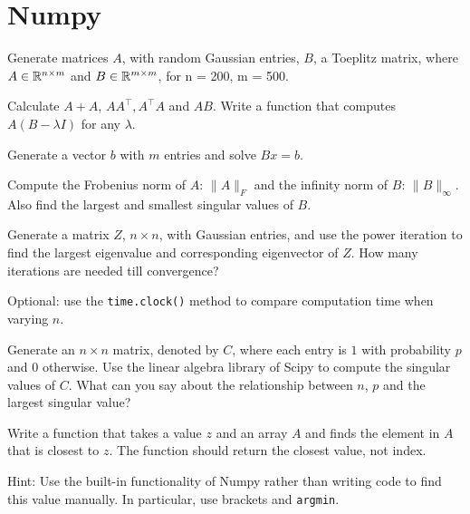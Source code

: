 \section{Numpy} %
\label{sec:numpy}
Generate matrices $A$, with random Gaussian entries, $B$, a Toeplitz matrix, where
$A \in \mathbb{R}^{n\times m}$ and $B \in \mathbb{R}^{m \times m}$, for n = 200, m = 500.

\begin{questions}

\label{sub:mat_ops}

Calculate $A + A$, $A A^\top, A^\top A$ and $AB$.
Write a function that computes $A(B - \lambda I)$ for any $\lambda$.

\label{sub:linear_system}

Generate a vector $b$ with $m$ entries and solve $Bx = b$.

\label{sub:norms}

Compute the Frobenius norm of $A$: $\|A\|_F$ and the infinity norm of $B$:
$\|B\|_{\infty}$. Also find the largest and smallest singular values of $B$.


\label{sub:power}

Generate a matrix $Z$, $n \times n$, with Gaussian entries, and use the power iteration to
find the largest eigenvalue and corresponding eigenvector of $Z$.
How many iterations are needed till convergence?

Optional: use the \texttt{time.clock()} method to compare computation time when varying $n$.

\label{sub:svd}

Generate an $n \times n$ matrix, denoted by $C$, where each entry is $1$ with probability $p$ and
$0$ otherwise.
Use the linear algebra library of Scipy to compute the singular values of $C$.
What can you say about the relationship between $n$, $p$ and the largest singular value?


\label{sub:nearest_neighbor}

Write a function that takes a value $z$ and an array $A$ and finds
the element in $A$ that is closest to $z$. The function should
return the closest value, not index.

Hint: Use the built-in functionality of Numpy rather than writing code to find this
value manually. In particular, use brackets and \texttt{argmin}.



\end{questions}
